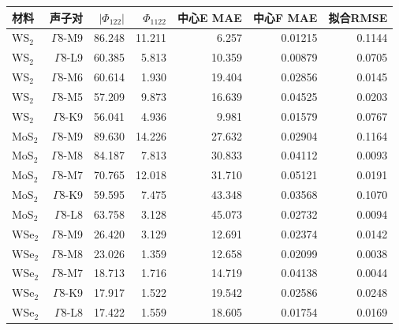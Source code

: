 \begin{tabular}{lrrrrrr}
\toprule
材料 & 声子对 & $|\Phi_{122}|$ & $\Phi_{1122}$ & 中心E MAE & 中心F MAE & 拟合RMSE \\
\midrule
WS$_2$ & $\Gamma$8-M9 & 86.248 & 11.211 & 6.257 & 0.01215 & 0.1144 \\
WS$_2$ & $\Gamma$8-L9 & 60.385 & 5.813 & 10.359 & 0.00879 & 0.0705 \\
WS$_2$ & $\Gamma$8-M6 & 60.614 & 1.930 & 19.404 & 0.02856 & 0.0145 \\
WS$_2$ & $\Gamma$8-M5 & 57.209 & 9.873 & 16.639 & 0.04525 & 0.0203 \\
WS$_2$ & $\Gamma$8-K9 & 56.041 & 4.936 & 9.981 & 0.01579 & 0.0767 \\
MoS$_2$ & $\Gamma$8-M9 & 89.630 & 14.226 & 27.632 & 0.02904 & 0.1164 \\
MoS$_2$ & $\Gamma$8-M8 & 84.187 & 7.813 & 30.833 & 0.04112 & 0.0093 \\
MoS$_2$ & $\Gamma$8-M7 & 70.765 & 12.018 & 31.710 & 0.05121 & 0.0191 \\
MoS$_2$ & $\Gamma$8-K9 & 59.595 & 7.475 & 43.348 & 0.03568 & 0.1070 \\
MoS$_2$ & $\Gamma$8-L8 & 63.758 & 3.128 & 45.073 & 0.02732 & 0.0094 \\
WSe$_2$ & $\Gamma$8-M9 & 26.420 & 3.129 & 12.691 & 0.02374 & 0.0142 \\
WSe$_2$ & $\Gamma$8-M8 & 23.026 & 1.359 & 12.658 & 0.02099 & 0.0038 \\
WSe$_2$ & $\Gamma$8-M7 & 18.713 & 1.716 & 14.719 & 0.04138 & 0.0044 \\
WSe$_2$ & $\Gamma$8-K9 & 17.917 & 1.522 & 19.542 & 0.02586 & 0.0248 \\
WSe$_2$ & $\Gamma$8-L8 & 17.422 & 1.559 & 18.605 & 0.01754 & 0.0169 \\
\bottomrule
\end{tabular}

